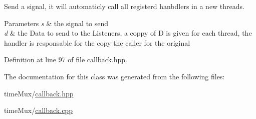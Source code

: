 Send a signal, it will automaticly call all registerd hanbdlers in a new threads. 


\begin{DoxyParams}{Parameters}
{\em s} & the signal to send \\
\hline
{\em d} & the Data to send to the Listeners, a coppy of D is given for each thread, the handler is responsable for the copy the caller for the original \\
\hline
\end{DoxyParams}


Definition at line 97 of file callback.\+hpp.



The documentation for this class was generated from the following files\+:\begin{DoxyCompactItemize}
\item 
time\+Mux/\hyperlink{callback_8hpp}{callback.\+hpp}\item 
time\+Mux/\hyperlink{callback_8cpp}{callback.\+cpp}\end{DoxyCompactItemize}
